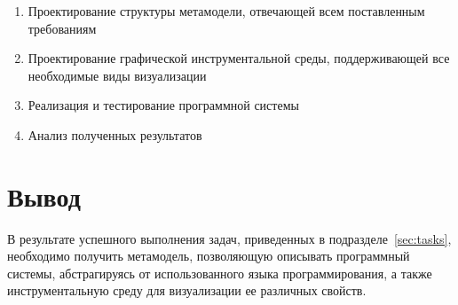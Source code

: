 \begin{enumerate}
    \item Проектирование структуры метамодели, отвечающей всем поставленным
    требованиям
    \item Проектирование графической инструментальной среды, поддерживающей все
    необходимые виды визуализации
    \item Реализация и тестирование программной системы
    \item Анализ полученных результатов
\end{enumerate}

\section{Вывод}
В результате успешного выполнения задач, приведенных в
подразделе~\ref{sec:tasks}, необходимо получить метамодель, позволяющую
описывать программный системы, абстрагируясь от использованного
языка программирования, а также инструментальную среду для визуализации ее
различных свойств.
